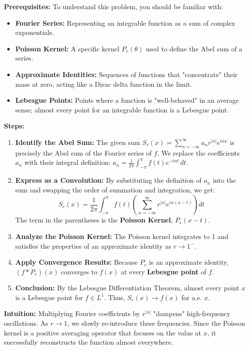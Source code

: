 \begin{solution}
\textbf{Prerequisites:}
To understand this problem, you should be familiar with:
\begin{itemize}
    \item \textbf{Fourier Series:} Representing an integrable function as a sum of complex exponentials.
    \item \textbf{Poisson Kernel:} A specific kernel $P_r(\theta)$ used to define the Abel sum of a series.
    \item \textbf{Approximate Identities:} Sequences of functions that "concentrate" their mass at zero, acting like a Dirac delta function in the limit.
    \item \textbf{Lebesgue Points:} Points where a function is "well-behaved" in an average sense; almost every point for an integrable function is a Lebesgue point.
\end{itemize}

\textbf{Steps:}
\begin{enumerate}
    \item \textbf{Identify the Abel Sum:} The given sum $S_r(x) = \sum_{n=-\infty}^{\infty} a_n r^{|n|}e^{inx}$ is precisely the Abel sum of the Fourier series of $f$. We replace the coefficients $a_n$ with their integral definition: $a_n = \frac{1}{2\pi}\int_{-\pi}^{\pi}f(t)e^{-int}\,dt$.
    \item \textbf{Express as a Convolution:} By substituting the definition of $a_n$ into the sum and swapping the order of summation and integration, we get:
    \[ S_r(x) = \frac{1}{2\pi} \int_{-\pi}^{\pi} f(t) \left( \sum_{n=-\infty}^{\infty} r^{|n|} e^{in(x-t)} \right) dt \]
    The term in the parentheses is the \textbf{Poisson Kernel}, $P_r(x-t)$.
    \item \textbf{Analyze the Poisson Kernel:} The Poisson kernel integrates to 1 and satisfies the properties of an approximate identity as $r \to 1^-$. 
    \item \textbf{Apply Convergence Results:} Because $P_r$ is an approximate identity, $(f * P_r)(x)$ converges to $f(x)$ at every \textbf{Lebesgue point} of $f$. 
    \item \textbf{Conclusion:} By the Lebesgue Differentiation Theorem, almost every point $x$ is a Lebesgue point for $f \in L^1$. Thus, $S_r(x) \to f(x)$ for a.e. $x$.
\end{enumerate}

\textbf{Intuition:}
Multiplying Fourier coefficients by $r^{|n|}$ "dampens" high-frequency oscillations. As $r \to 1$, we slowly re-introduce these frequencies. Since the Poisson kernel is a positive averaging operator that focuses on the value at $x$, it successfully reconstructs the function almost everywhere.
\end{solution}

